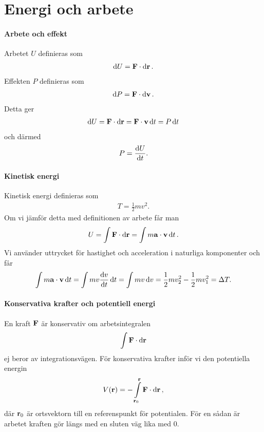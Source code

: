 \section{Energi och arbete}

\paragraph{Arbete och effekt}
Arbetet $U$ definieras som
\begin{align*}
	\dd{U} = \vb{F}\cdot\dd{\vb{r}}.
\end{align*}
Effekten $P$ definieras som
\begin{align*}
	\dd{P} = \vb{F}\cdot\dd{\vb{v}}.
\end{align*}
Detta ger
\begin{align*}
	\dd{U} = \vb{F}\cdot\dd{\vb{r}} = \vb{F}\cdot\vb{v}\dd{t} = P\dd{t}
\end{align*}
och därmed
\begin{align*}
	P = \dv{U}{t}.
\end{align*}

\paragraph{Kinetisk energi}
Kinetisk energi definieras som
\begin{align*}
	T = \frac{1}{2}mv^2.
\end{align*}
Om vi jämför detta med definitionen av arbete får man
\begin{align*}
	U = \int\vb{F}\cdot\dd{\vb{r}} = \int m\vb{a}\cdot\vb{v}\dd{t}.
\end{align*}
Vi använder uttrycket för hastighet och acceleration i naturliga komponenter och får
\begin{align*}
	\int m\vb{a}\cdot\vb{v}\dd{t} = \int mv\dv{v}{t}\dd{t} = \int mv\dd{v} = \frac{1}{2}mv_2^2 - \frac{1}{2}mv_1^2 = \Delta T.
\end{align*}

\paragraph{Konservativa krafter och potentiell energi}
En kraft $\vb{F}$ är konservativ om arbetsintegralen
\begin{align*}
	\int\vb{F}\cdot\dd{\vb{r}}
\end{align*}
ej beror av integrationsvägen. För konservativa krafter inför vi den potentiella energin
\begin{align*}
	V(\vb{r}) = -\int\limits_{\vb{r}_0}^{\vb{r}}\vb{F}\cdot\dd{\vb{r}},
\end{align*}
där $\vb{r}_0$ är ortsvektorn till en referenspunkt för potentialen. För en sådan är arbetet kraften gör längs med en sluten väg lika med $0$. %

